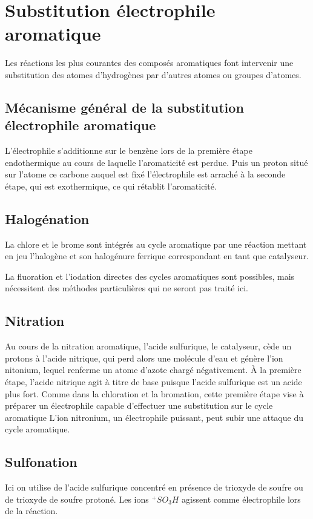\section{Substitution électrophile aromatique}

Les réactions les plus courantes des composés aromatiques font intervenir une substitution des atomes d'hydrogènes par d'autres atomes ou groupes d'atomes.

\subsection{Mécanisme général de la substitution électrophile aromatique}
L'électrophile s'additionne sur le benzène lors de la première étape endothermique au cours de laquelle l'aromaticité est perdue.
Puis un proton situé sur l'atome ce carbone auquel est fixé l'électrophile est arraché à la seconde étape, qui est exothermique, ce qui rétablit l'aromaticité.

\subsection{Halogénation}

La chlore et le brome sont intégrés au cycle aromatique par une réaction mettant en jeu l'halogène et son halogénure ferrique correspondant en tant que catalyseur.

La fluoration et l'iodation directes des cycles aromatiques sont possibles, mais nécessitent des méthodes particulières qui ne seront pas traité ici.

\subsection{Nitration}
Au cours de la nitration aromatique, l'acide sulfurique, le catalyseur, cède un protons à l'acide nitrique, qui perd alors une molécule d'eau et génère l'ion nitonium, lequel renferme un atome d'azote chargé négativement.
\`A la première étape, l'acide nitrique agit à titre de base puisque l'acide sulfurique est un acide plus fort.
Comme dans la chloration et la bromation, cette première étape vise à préparer un électrophile capable d'effectuer une substitution sur le cycle aromatique L'ion nitronium, un électrophile puissant, peut subir une attaque du cycle aromatique.

\subsection{Sulfonation}
Ici on utilise de l'acide sulfurique concentré en présence de trioxyde de soufre ou de trioxyde de soufre protoné.
Les ions $^+SO_3H$ agissent comme électrophile lors de la réaction.

